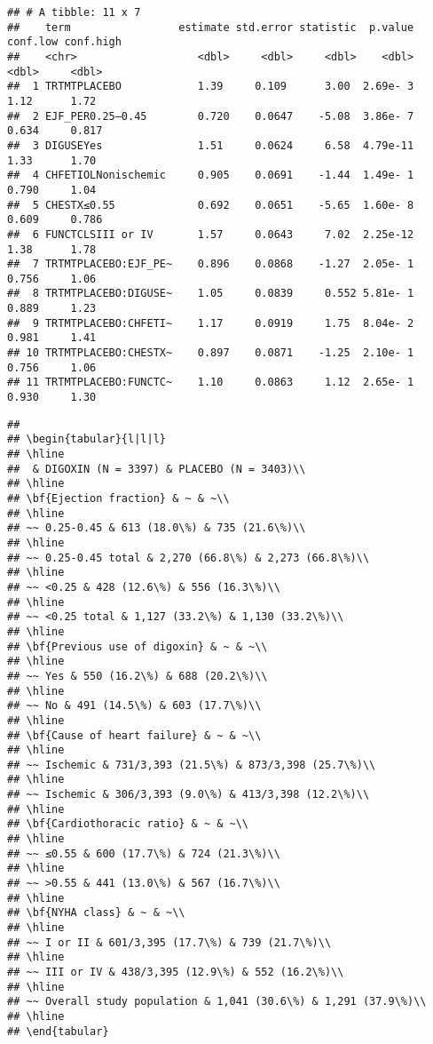 \documentclass[
]{article}
\begin{document}
\begin{verbatim}
## # A tibble: 11 x 7
##    term                 estimate std.error statistic  p.value conf.low conf.high
##    <chr>                   <dbl>     <dbl>     <dbl>    <dbl>    <dbl>     <dbl>
##  1 TRTMTPLACEBO            1.39     0.109      3.00  2.69e- 3    1.12      1.72 
##  2 EJF_PER0.25–0.45        0.720    0.0647    -5.08  3.86e- 7    0.634     0.817
##  3 DIGUSEYes               1.51     0.0624     6.58  4.79e-11    1.33      1.70 
##  4 CHFETIOLNonischemic     0.905    0.0691    -1.44  1.49e- 1    0.790     1.04 
##  5 CHESTX≤0.55             0.692    0.0651    -5.65  1.60e- 8    0.609     0.786
##  6 FUNCTCLSIII or IV       1.57     0.0643     7.02  2.25e-12    1.38      1.78 
##  7 TRTMTPLACEBO:EJF_PE~    0.896    0.0868    -1.27  2.05e- 1    0.756     1.06 
##  8 TRTMTPLACEBO:DIGUSE~    1.05     0.0839     0.552 5.81e- 1    0.889     1.23 
##  9 TRTMTPLACEBO:CHFETI~    1.17     0.0919     1.75  8.04e- 2    0.981     1.41 
## 10 TRTMTPLACEBO:CHESTX~    0.897    0.0871    -1.25  2.10e- 1    0.756     1.06 
## 11 TRTMTPLACEBO:FUNCTC~    1.10     0.0863     1.12  2.65e- 1    0.930     1.30
\end{verbatim}

\begin{verbatim}
## 
## \begin{tabular}{l|l|l}
## \hline
##  & DIGOXIN (N = 3397) & PLACEBO (N = 3403)\\
## \hline
## \bf{Ejection fraction} & ~ & ~\\
## \hline
## ~~ 0.25-0.45 & 613 (18.0\%) & 735 (21.6\%)\\
## \hline
## ~~ 0.25-0.45 total & 2,270 (66.8\%) & 2,273 (66.8\%)\\
## \hline
## ~~ <0.25 & 428 (12.6\%) & 556 (16.3\%)\\
## \hline
## ~~ <0.25 total & 1,127 (33.2\%) & 1,130 (33.2\%)\\
## \hline
## \bf{Previous use of digoxin} & ~ & ~\\
## \hline
## ~~ Yes & 550 (16.2\%) & 688 (20.2\%)\\
## \hline
## ~~ No & 491 (14.5\%) & 603 (17.7\%)\\
## \hline
## \bf{Cause of heart failure} & ~ & ~\\
## \hline
## ~~ Ischemic & 731/3,393 (21.5\%) & 873/3,398 (25.7\%)\\
## \hline
## ~~ Ischemic & 306/3,393 (9.0\%) & 413/3,398 (12.2\%)\\
## \hline
## \bf{Cardiothoracic ratio} & ~ & ~\\
## \hline
## ~~ ≤0.55 & 600 (17.7\%) & 724 (21.3\%)\\
## \hline
## ~~ >0.55 & 441 (13.0\%) & 567 (16.7\%)\\
## \hline
## \bf{NYHA class} & ~ & ~\\
## \hline
## ~~ I or II & 601/3,395 (17.7\%) & 739 (21.7\%)\\
## \hline
## ~~ III or IV & 438/3,395 (12.9\%) & 552 (16.2\%)\\
## \hline
## ~~ Overall study population & 1,041 (30.6\%) & 1,291 (37.9\%)\\
## \hline
## \end{tabular}
\end{verbatim}
\end{document}

